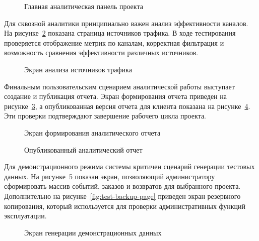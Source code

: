 \begin{figure}[H]
    \centering
    \caption{Главная аналитическая панель проекта}
    \label{fig:test-dashboard-kpi}
\end{figure}

Для сквозной аналитики принципиально важен анализ эффективности каналов. На рисунке~\ref{fig:test-traffic-sources-analysis} показана страница источников трафика. В ходе тестирования проверяется отображение метрик по каналам, корректная фильтрация и возможность сравнения эффективности различных источников.

\begin{figure}[H]
    \centering
    \caption{Экран анализа источников трафика}
    \label{fig:test-traffic-sources-analysis}
\end{figure}

Финальным пользовательским сценарием аналитической работы выступает создание и публикация отчета. Экран формирования отчета приведен на рисунке~\ref{fig:test-report-create}, а опубликованная версия отчета для клиента показана на рисунке~\ref{fig:test-report-published}. Эти проверки подтверждают завершение рабочего цикла проекта.

\begin{figure}[H]
    \centering
    \caption{Экран формирования аналитического отчета}
    \label{fig:test-report-create}
\end{figure}

\begin{figure}[H]
    \centering
    \caption{Опубликованный аналитический отчет}
    \label{fig:test-report-published}
\end{figure}

Для демонстрационного режима системы критичен сценарий генерации тестовых данных. На рисунке~\ref{fig:test-demo-data-generation} показан экран, позволяющий администратору сформировать массив событий, заказов и возвратов для выбранного проекта. Дополнительно на рисунке~\ref{fig:test-backup-page} приведен экран резервного копирования, который используется для проверки административных функций эксплуатации.

\begin{figure}[H]
    \centering
    \caption{Экран генерации демонстрационных данных}
    \label{fig:test-demo-data-generation}
\end{figure}

